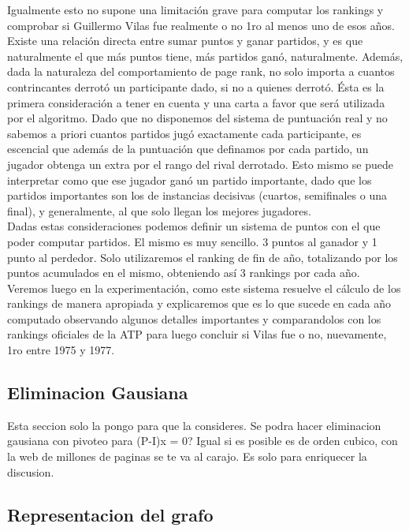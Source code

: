 Igualmente esto no supone una limitación grave para computar los rankings y comprobar si Guillermo Vilas fue realmente o no 1ro al menos uno de esos años.
\\
Existe una relación directa entre sumar puntos y ganar partidos, y es que naturalmente el que más puntos tiene, más partidos ganó, naturalmente.
Además, dada la naturaleza del comportamiento de page rank, no solo importa a cuantos contrincantes derrotó un participante dado, si no a quienes derrotó. Ésta es la primera consideración a tener en cuenta y una carta a favor que será utilizada por el algoritmo. Dado que no disponemos del sistema de puntuación real y no sabemos a priori cuantos partidos jugó exactamente cada participante, es escencial que además de la puntuación que definamos por cada partido, un jugador obtenga un extra por el rango del rival derrotado. Esto mismo se puede interpretar como que ese jugador ganó un partido importante, dado que los partidos importantes son los de instancias decisivas (cuartos, semifinales o una final), y generalmente, al que solo llegan los mejores jugadores.    
\\
Dadas estas consideraciones podemos definir un sistema de puntos con el que poder computar partidos. El mismo es muy sencillo. 3 puntos al ganador y 1 punto al perdedor.
 Solo utilizaremos el ranking de fin de año, totalizando por los puntos acumulados en el mismo, obteniendo así 3 rankings por cada año.
\\
Veremos luego en la experimentación, como este sistema resuelve el cálculo de los rankings de manera apropiada y explicaremos que es lo que sucede en cada año computado observando algunos detalles importantes y comparandolos con los rankings oficiales de la ATP para luego concluir si Vilas fue o no, nuevamente, 1ro entre 1975 y 1977.

\subsection{Eliminacion Gausiana}

Esta seccion solo la pongo para que la consideres. Se podra hacer eliminacion gausiana con pivoteo para (P-I)x = 0? Igual si es posible es de orden cubico, con la web de millones de paginas se te va al carajo. Es solo para enriquecer la discusion.

\subsection{Representacion del grafo}

